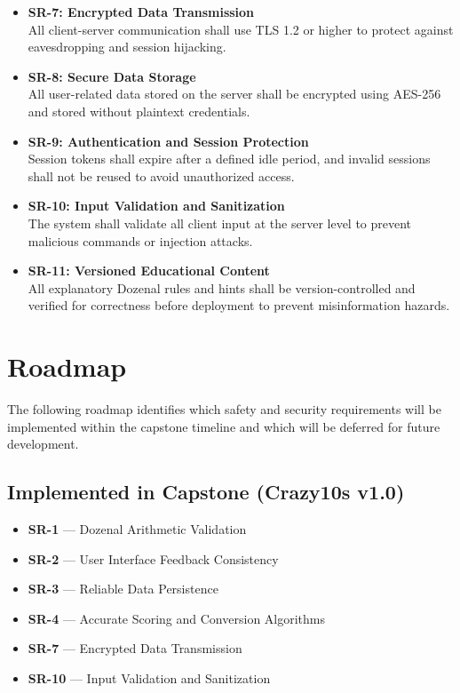 \documentclass{article}
\begin{document}
\begin{itemize}
  \item \textbf{SR-7: Encrypted Data Transmission}
  \\All client-server communication shall use TLS 1.2 or higher to protect 
  against eavesdropping and session hijacking.

  \item \textbf{SR-8: Secure Data Storage}
  \\All user-related data stored on the server shall be encrypted using 
  AES-256 and stored without plaintext credentials.

  \item \textbf{SR-9: Authentication and Session Protection}
  \\Session tokens shall expire after a defined idle period, and invalid 
  sessions shall not be reused to avoid unauthorized access.

  \item \textbf{SR-10: Input Validation and Sanitization}
  \\The system shall validate all client input at the server level to prevent 
  malicious commands or injection attacks.

  \item \textbf{SR-11: Versioned Educational Content}
  \\All explanatory Dozenal rules and hints shall be version-controlled and 
  verified for correctness before deployment to prevent misinformation hazards.
\end{itemize}

\newpage
\section{Roadmap}

The following roadmap identifies which safety and security requirements will be 
implemented within the capstone timeline and which will be deferred for future 
development.

\subsection{Implemented in Capstone (Crazy10s v1.0)}

\begin{itemize}
  \item \textbf{SR-1} — Dozenal Arithmetic Validation  
  \item \textbf{SR-2} — User Interface Feedback Consistency  
  \item \textbf{SR-3} — Reliable Data Persistence  
  \item \textbf{SR-4} — Accurate Scoring and Conversion Algorithms  
  \item \textbf{SR-7} — Encrypted Data Transmission  
  \item \textbf{SR-10} — Input Validation and Sanitization  
\end{itemize}
\end{document}
